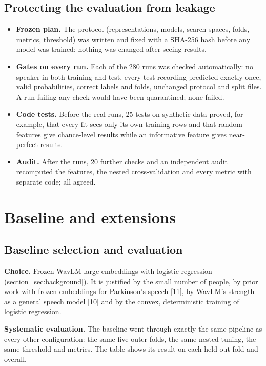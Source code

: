 \documentclass[11pt,a4paper]{article}
\begin{document}
\subsection{Protecting the evaluation from leakage}
\begin{itemize}\item \textbf{Frozen plan.} The protocol (representations, models, search spaces, folds, metrics, threshold) was written and fixed with a SHA-256 hash before any model was trained; nothing was changed after seeing results.
\item \textbf{Gates on every run.} Each of the 280 runs was checked automatically: no speaker in both training and test, every test recording predicted exactly once, valid probabilities, correct labels and folds, unchanged protocol and split files. A run failing any check would have been quarantined; none failed.
\item \textbf{Code tests.} Before the real runs, 25 tests on synthetic data proved, for example, that every fit sees only its own training rows and that random features give chance-level results while an informative feature gives near-perfect results.
\item \textbf{Audit.} After the runs, 20 further checks and an independent audit recomputed the features, the nested cross-validation and every metric with separate code; all agreed.
\end{itemize}
\section{Baseline and extensions}\label{sec:baseline-ext}
\subsection{Baseline selection and evaluation}\label{sec:baseline}
\textbf{Choice.} Frozen WavLM-large embeddings with logistic regression (section~\ref{sec:background}). It is justified by the small number of people, by prior work with frozen embeddings for Parkinson's speech [11], by WavLM's strength as a general speech model [10] and by the convex, deterministic training of logistic regression.

\textbf{Systematic evaluation.} The baseline went through exactly the same pipeline as every other configuration: the same five outer folds, the same nested tuning, the same threshold and metrics. The table shows its result on each held-out fold and overall.
\end{document}
